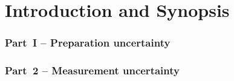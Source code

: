 \let\textcircled=\pgftextcircled
\chapter{Introduction and Synopsis}
\label{chap:intro}

\subsection*{Part~I -- Preparation uncertainty}



\subsection*{Part~2 -- Measurement uncertainty}

